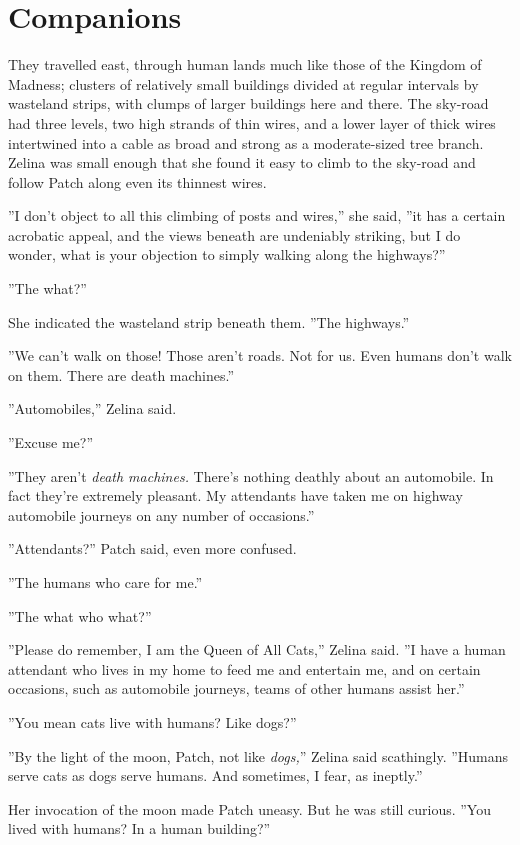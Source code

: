 \documentclass[12pt]{book}
\begin{document}

\section{Companions}

They travelled east, through human lands much like those of the
Kingdom of Madness; clusters of relatively small buildings divided at
regular intervals by wasteland strips, with clumps of larger buildings
here and there. The sky-road had three levels, two high strands of
thin wires, and a lower layer of thick wires intertwined into a cable
as broad and strong as a moderate-sized tree branch. Zelina was small
enough that she found it easy to climb to the sky-road and follow
Patch along even its thinnest wires.

''I don't object to all this climbing of posts and wires,'' she said,
''it has a certain acrobatic appeal, and the views beneath are
undeniably striking, but I do wonder, what is your objection to simply
walking along the highways?''

''The what?''

She indicated the wasteland strip beneath them. ''The highways.''

''We can't walk on those! Those aren't roads. Not for us. Even humans
don't walk on them. There are death machines.''

''Automobiles,'' Zelina said.

''Excuse me?''

''They aren't \textit{death machines.} There's nothing deathly about
an automobile. In fact they're extremely pleasant. My attendants have
taken me on highway automobile journeys on any number of occasions.''

''Attendants?'' Patch said, even more confused.

''The humans who care for me.''

''The what who what?''

''Please do remember, I am the Queen of All Cats,'' Zelina said. ''I
have a human attendant who lives in my home to feed me and entertain
me, and on certain occasions, such as automobile journeys, teams of
other humans assist her.''

''You mean cats live with humans? Like dogs?''

''By the light of the moon, Patch, not like \textit{dogs,}'' Zelina
said scathingly. ''Humans serve cats as dogs serve humans. And
sometimes, I fear, as ineptly.''

Her invocation of the moon made Patch uneasy. But he was still
curious. ''You lived with humans? In a human building?''
\end{document}
